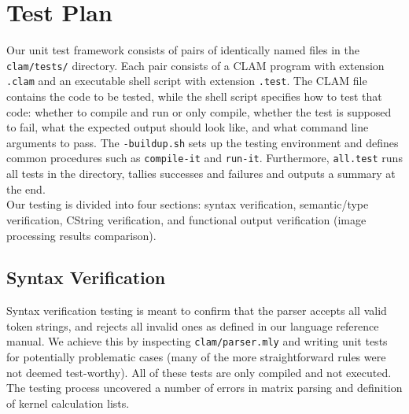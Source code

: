 \chapter{Test Plan}
\label{chap:testplan}

Our unit test framework consists of pairs of identically named files in the \texttt{clam/tests/} directory.
Each pair consists of a CLAM program with extension \texttt{.clam} and an executable shell script
with extension \texttt{.test}. The CLAM file contains the code to be tested, while the shell script
specifies how to test that code: whether to compile and run or only compile, whether the test is supposed to fail,
what the expected output should look like, and what command line arguments to pass.
The \texttt{-buildup.sh} sets up the testing environment and defines common procedures such as
\texttt{compile-it} and \texttt{run-it}. Furthermore, \texttt{all.test} runs all tests in the directory,
tallies successes and failures and outputs a summary at the end.\\

Our testing is divided into four sections: syntax verification, semantic/type verification, CString verification, and functional output verification (image processing results comparison). 

\section{Syntax Verification}
\label{testing:syntax}

Syntax verification testing is meant to confirm that the parser accepts all valid token strings,
and rejects all invalid ones as defined in our language reference manual.
We achieve this by inspecting \texttt{clam/parser.mly} and writing unit tests for
potentially problematic cases (many of the more straightforward rules were not deemed test-worthy).
All of these tests are only compiled and not executed. The testing process uncovered a number of errors
in matrix parsing and definition of kernel calculation lists.\\

